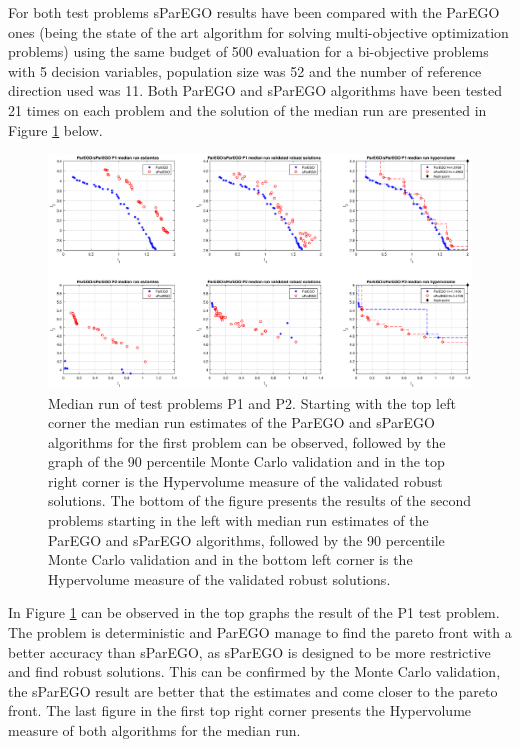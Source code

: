 \documentclass[10pt]{llncs}
\begin{document}
For both test problems sParEGO results have been compared with the ParEGO ones (being the state of the art algorithm for solving multi-objective optimization problems) using the same budget of 500 evaluation for a bi-objective problems with 5 decision variables, population size was 52 and the number of reference direction used was 11. Both ParEGO and sParEGO algorithms have been tested 21 times on each problem and the solution of the median run are presented in Figure \ref{fig:MedainRun} below.  
    
\begin{figure}[h]
\centering
\includegraphics[width=1.5\textwidth, center]{P1P2}
\caption{Median run of test problems P1 and P2. Starting with the top left corner the median run estimates of the ParEGO and sParEGO algorithms for the first problem can be observed, followed by the graph of the 90 percentile Monte Carlo validation and in the top right corner is the Hypervolume measure of the validated robust solutions. The bottom of the figure presents the results of the second problems starting in the left with median run estimates of the ParEGO and sParEGO algorithms, followed by the 90 percentile Monte Carlo validation and in the bottom left corner is the Hypervolume measure of the validated robust solutions.}
\label{fig:MedainRun}
\end{figure}

In Figure \ref{fig:MedainRun} can be observed in the top graphs the result of the P1 test problem. The problem is deterministic and ParEGO manage to find the pareto front with a better accuracy than sParEGO, as sParEGO is designed to be more restrictive and find robust solutions. This can be confirmed by the Monte Carlo validation, the sParEGO result are better that the estimates and come closer to the pareto front. The last figure in the first top right corner presents the Hypervolume measure of both algorithms for the median run.
\end{document}
